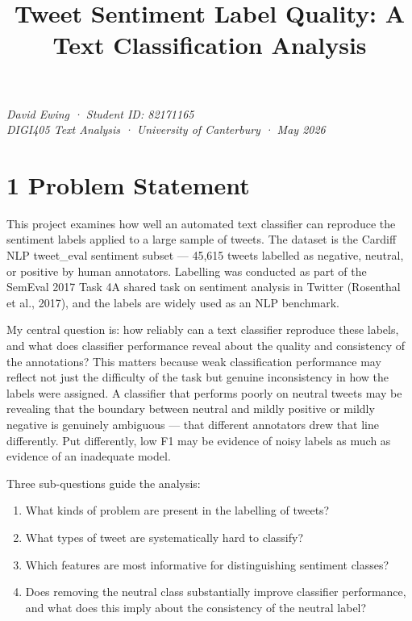 \documentclass[
  12pt,
]{article}
\title{Tweet Sentiment Label Quality: A Text Classification Analysis}
\author{}
\date{}
\begin{document}
\maketitle

\emph{David Ewing · Student ID: 82171165\\
DIGI405 Text Analysis · University of Canterbury · May 2026}

\section{1 Problem Statement}\label{problem-statement}

This project examines how well an automated text classifier can
reproduce the sentiment labels applied to a large sample of tweets. The
dataset is the Cardiff NLP tweet\_eval sentiment subset ---
45,615 tweets labelled as negative, neutral, or positive
by human annotators. Labelling was conducted as part of the SemEval 2017
Task 4A shared task on sentiment analysis in Twitter (Rosenthal et al.,
2017), and the labels are widely used as an NLP benchmark.

My central question is: how reliably can a text classifier reproduce
these labels, and what does classifier performance reveal about the
quality and consistency of the annotations? This matters because weak
classification performance may reflect not just the difficulty of the
task but genuine inconsistency in how the labels were assigned. A
classifier that performs poorly on neutral tweets may be revealing that
the boundary between neutral and mildly positive or mildly negative is
genuinely ambiguous --- that different annotators drew that line
differently. Put differently, low F1 may be evidence of noisy labels as
much as evidence of an inadequate model.

Three sub-questions guide the analysis:

\begin{enumerate}
\def\labelenumi{\arabic{enumi}.}
\item
  What kinds of problem are present in the labelling of tweets?
\item
  What types of tweet are systematically hard to classify?
\item
  Which features are most informative for distinguishing sentiment
  classes?
\item
  Does removing the neutral class substantially improve classifier
  performance, and what does this imply about the consistency of the
  neutral label?
\end{enumerate}
\end{document}
